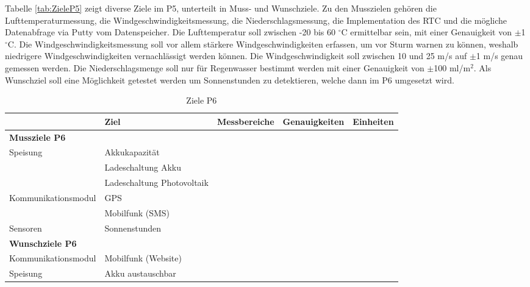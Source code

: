 \begin{landscape}
Tabelle \ref{tab:ZieleP5} zeigt diverse Ziele im P5, unterteilt in Muss- und Wunschziele. Zu den Musszielen gehören die Lufttemperaturmessung, die Windgeschwindigkeitsmessung, die Niederschlagsmessung, die Implementation des RTC und die mögliche Datenabfrage via Putty vom Datenspeicher. Die Lufttemperatur soll zwischen -20 bis 60 $^\circ$C ermittelbar sein, mit einer Genauigkeit von $\pm$1 $^\circ$C. Die Windgeschwindigkeitsmessung soll vor allem stärkere Windgeschwindigkeiten erfassen, um vor Sturm warnen zu können, weshalb niedrigere Windgeschwindigkeiten vernachlässigt werden können. Die Windgeschwindigkeit soll zwischen 10 und 25 m/s auf $\pm$1 m/s genau gemessen werden. Die Niederschlagsmenge soll nur für Regenwasser bestimmt werden mit einer Genauigkeit von $\pm$100 ml/m$^2$. Als Wunschziel soll eine Möglichkeit getestet werden um Sonnenstunden zu detektieren, welche dann im P6 umgesetzt wird.  \\

\newpage
\begin{table}[htbp]
  \centering
  \caption{Ziele P6}
    \begin{tabular}{l|l|r|r|r}
          & \textbf{Ziel} & \multicolumn{1}{l|}{\textbf{Messbereiche}} & \multicolumn{1}{l|}{\textbf{Genauigkeiten}} & \multicolumn{1}{l}{\textbf{Einheiten}} \\
    \toprule
    \multicolumn{1}{l}{\textbf{Mussziele P6}} & \multicolumn{1}{r}{} & \multicolumn{1}{r}{} & \multicolumn{1}{r}{} &  \\
    \toprule
    Speisung & Akkukapazität &       &       &  \\
\cline{2-5}          & Ladeschaltung Akku &       &       &  \\
\cline{2-5}           & Ladeschaltung Photovoltaik &       &       &  \\
    \hline
    Kommunikationsmodul & GPS   &       &       &  \\
\cline{2-5}          & Mobilfunk (SMS) &       &       &  \\
\hline
Sensoren & Sonnenstunden &       &       &  \\
    \bottomrule
    \multicolumn{1}{l}{\textbf{Wunschziele P6}} & \multicolumn{1}{r}{} & \multicolumn{1}{r}{} & \multicolumn{1}{r}{} &  \\
    \toprule
    Kommunikationsmodul & Mobilfunk (Website) &       &       &  \\
    \hline
    Speisung & Akku austauschbar &       &       &  \\
    \bottomrule
    \end{tabular}%
  \label{tab:ZieleP6}%
\end{table}%


\end{landscape}
